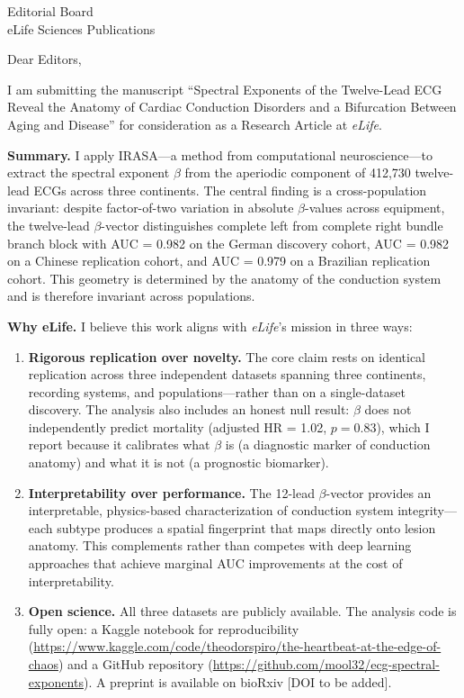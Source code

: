 \documentclass[11pt]{letter}
\begin{document}
\begin{letter}{Editorial Board\\eLife Sciences Publications}

\opening{Dear Editors,}

I am submitting the manuscript ``Spectral Exponents of the Twelve-Lead ECG Reveal the Anatomy of Cardiac Conduction Disorders and a Bifurcation Between Aging and Disease'' for consideration as a Research Article at \textit{eLife}.

\textbf{Summary.} I apply IRASA---a method from computational neuroscience---to extract the spectral exponent $\beta$ from the aperiodic component of 412,730 twelve-lead ECGs across three continents. The central finding is a cross-population invariant: despite factor-of-two variation in absolute $\beta$-values across equipment, the twelve-lead $\beta$-vector distinguishes complete left from complete right bundle branch block with AUC = 0.982 on the German discovery cohort, AUC = 0.982 on a Chinese replication cohort, and AUC = 0.979 on a Brazilian replication cohort. This geometry is determined by the anatomy of the conduction system and is therefore invariant across populations.

\textbf{Why eLife.} I believe this work aligns with \textit{eLife}'s mission in three ways:

\begin{enumerate}
\item \textbf{Rigorous replication over novelty.} The core claim rests on identical replication across three independent datasets spanning three continents, recording systems, and populations---rather than on a single-dataset discovery. The analysis also includes an honest null result: $\beta$ does not independently predict mortality (adjusted HR = 1.02, $p = 0.83$), which I report because it calibrates what $\beta$ is (a diagnostic marker of conduction anatomy) and what it is not (a prognostic biomarker).

\item \textbf{Interpretability over performance.} The 12-lead $\beta$-vector provides an interpretable, physics-based characterization of conduction system integrity---each subtype produces a spatial fingerprint that maps directly onto lesion anatomy. This complements rather than competes with deep learning approaches that achieve marginal AUC improvements at the cost of interpretability.

\item \textbf{Open science.} All three datasets are publicly available. The analysis code is fully open: a Kaggle notebook for reproducibility (\url{https://www.kaggle.com/code/theodorspiro/the-heartbeat-at-the-edge-of-chaos}) and a GitHub repository (\url{https://github.com/mool32/ecg-spectral-exponents}). A preprint is available on bioRxiv [DOI to be added].
\end{enumerate}


\end{letter}
\end{document}
